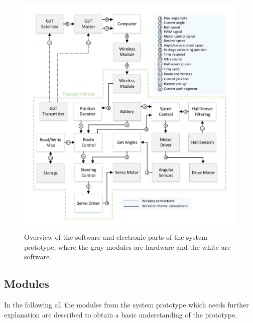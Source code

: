 \begin{figure}[H]
	\centering
	\includegraphics[scale=.9]{figures/systemOverview2}
	\caption{Overview of the software and electronic parts of the system prototype, where the gray modules are hardware and the white are software.}
	\label{fig:systemOverview2}
\end{figure}

\subsection{Modules}
In the following all the modules from the system prototype which needs further explanation are described to obtain a basic understanding of the prototype.

%

